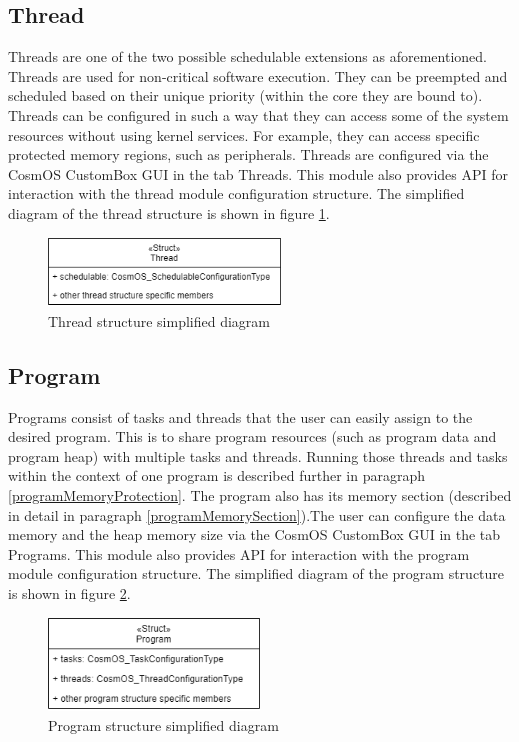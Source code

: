 \subsection{Thread}
Threads are one of the two possible schedulable extensions as aforementioned. Threads are used for non-critical software execution. They can be preempted and scheduled based on their unique priority (within the core they are bound to). Threads can be configured in such a way that they can access some of the system resources without using kernel services. For example, they can access specific protected memory regions, such as peripherals. Threads are configured via the CosmOS CustomBox \ac{GUI} in the tab Threads. This module also provides \ac{API} for interaction with the thread module configuration structure. The simplified diagram of the thread structure is shown in figure \ref{fig:threadStructure}.

\begin{figure}[H]
\begin{center}
\includegraphics[width=0.55\textwidth]{images/thread_structure.png}
\caption{Thread structure simplified diagram}
\label{fig:threadStructure}
\end{center}
\end{figure}

\subsection{Program}
Programs consist of tasks and threads that the user can easily assign to the desired program. This is to share program resources (such as program data and program heap) with multiple tasks and threads. Running those threads and tasks within the context of one program is described further in paragraph \ref{programMemoryProtection}. The program also has its memory section (described in detail in paragraph \ref{programMemorySection}).The user can configure the data memory and the heap memory size via the CosmOS CustomBox \ac{GUI} in the tab Programs. This module also provides \ac{API} for interaction with the program module configuration structure. The simplified diagram of the program structure is shown in figure \ref{fig:programStructure}.

\begin{figure}[H]
\begin{center}
\includegraphics[width=0.5\textwidth]{images/program_structure.png}
\caption{Program structure simplified diagram}
\label{fig:programStructure}
\end{center}
\end{figure}

